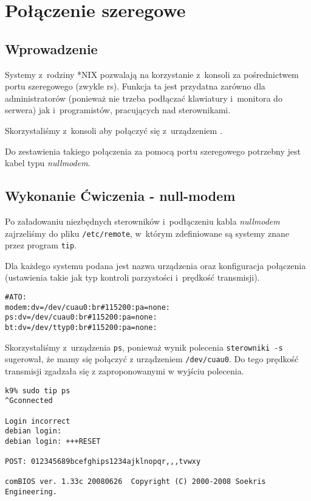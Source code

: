 \section{Połączenie szeregowe}
\subsection{Wprowadzenie}
Systemy z~rodziny *NIX pozwalają na korzystanie z~konsoli za pośrednictwem portu szeregowego (zwykle rs).
Funkcja ta jest przydatna zarówno dla administratorów (ponieważ nie trzeba podłączać klawiatury i~monitora do serwera) jak i~programistów, pracujących nad sterownikami.

Skorzystaliśmy z~konsoli aby połączyć się z~urządzeniem \zielone{}.

Do zestawienia takiego połączenia za pomocą portu szeregowego potrzebny jest kabel typu \emph{null\dywiz modem}\cite{serial-console}.

\subsection{Wykonanie Ćwiczenia - null-modem}
\label{sec:serial:null-modem}

Po załadowaniu niezbędnych sterowników i~podłączeniu kabla \emph{null\dywiz modem} zajrzeliśmy do pliku \texttt{/etc/remote}, w~którym zdefiniowane są systemy znane przez program \texttt{tip}.

Dla każdego systemu podana jest nazwa urządzenia oraz konfiguracja połączenia (ustawienia takie jak typ kontroli parzystości i~prędkość transmisji).

\begin{lstlisting}[caption={\texttt{/etc/remote}}]
#ATO:
modem:dv=/dev/cuau0:br#115200:pa=none:
ps:dv=/dev/cuau0:br#115200:pa=none:
bt:dv=/dev/ttyp0:br#115200:pa=none:
\end{lstlisting}

Skorzystaliśmy z~urządzenia \texttt{ps}, ponieważ wynik polecenia \texttt{sterowniki -s} sugerował, że mamy się połączyć z urządzeniem \texttt{/dev/cuau0}.
Do tego prędkość transmisji zgadzała się z zaproponowanymi w wyjściu polecenia.

\begin{lstlisting}[caption={Połączenie z konsolą za pomocą programu tip}]
k9% sudo tip ps
^Gconnected

Login incorrect
debian login:
debian login: +++RESET

POST: 012345689bcefghips1234ajklnopqr,,,tvwxy

comBIOS ver. 1.33c 20080626  Copyright (C) 2000-2008 Soekris Engineering.

\end{lstlisting}

